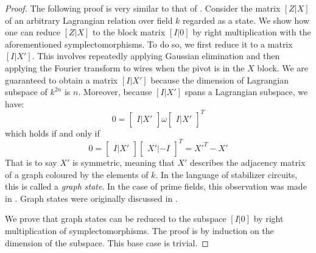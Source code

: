 \begin{proof}
The following proof is very similar to that of  \cite[Lem. 6]{aaronson}.
Consider the matrix $[Z|X]$ of an arbitrary Lagrangian relation over field $k$ regarded as a state.
%
We show how one can reduce $[Z|X]$ to the block matrix $[I|0]$ by right multiplication with the aforementioned symplectomorphisms.
To do so, we first reduce it to a matrix $[I|X']$.
This involves repeatedly applying Gaussian elimination and then applying the Fourier transform to wires when the pivot is in the $X$ block.
We are guaranteed to obtain a matrix $[I|X']$ because the dimension of Lagrangian subspace of $k^{2n}$ is $n$. Moreover, because  $[I|X']$ spans a Lagrangian subspace, we have: 
$$
0
=
\begin{bmatrix}
I | X'
\end{bmatrix}
\omega
\begin{bmatrix}
I | X'
\end{bmatrix}^T
$$
which holds if and only if 
$$
0=
\begin{bmatrix}
I | X'
\end{bmatrix}
\begin{bmatrix}
X' | -I 
\end{bmatrix}^T
=
{X'}^T-X'
$$
That is to say $X'$ is symmetric, meaning that $X'$ describes the adjacency matrix of a graph coloured by the elements of $k$.
In the language of stabilizer circuits, this is called a {\em graph state}.  In the case of prime fields, this observation was made in \cite[Equation 18]{gross}.  Graph states were originally discussed in \cite{hein2006entanglement}.

We prove that graph states can be reduced to the subspace $[I|0]$ by right multiplication of  symplectomorphisms.
The proof is by induction on the dimension of the subspace.
This base case is trivial.


\end{proof}
